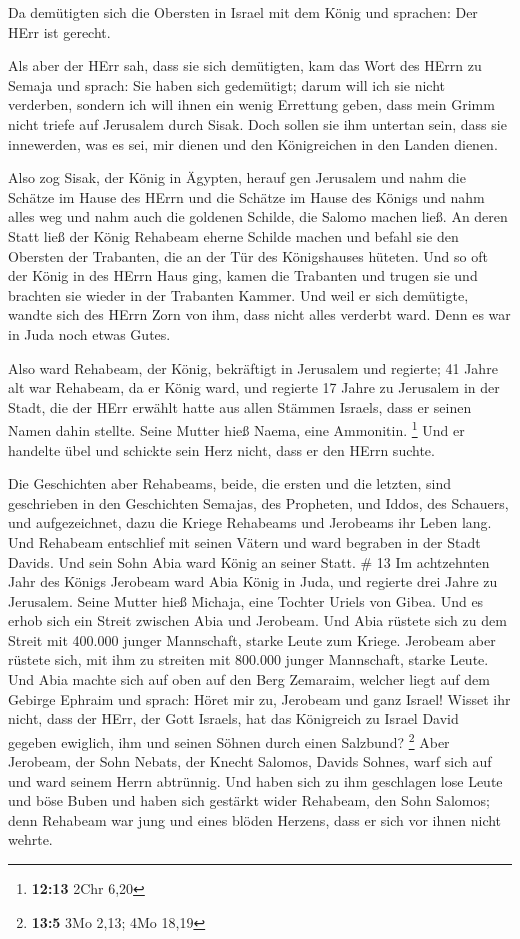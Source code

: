  Da demütigten sich die Obersten in Israel mit dem König und
sprachen: Der HErr ist gerecht.

 Als aber der HErr sah, dass sie sich demütigten, kam das
Wort des HErrn zu Semaja und sprach: Sie haben sich gedemütigt; darum
will ich sie nicht verderben, sondern ich will ihnen ein wenig Errettung
geben, dass mein Grimm nicht triefe auf Jerusalem durch Sisak.
 Doch sollen sie ihm untertan sein, dass sie innewerden, was
es sei, mir dienen und den Königreichen in den Landen dienen.

 Also zog Sisak, der König in Ägypten, herauf gen Jerusalem
und nahm die Schätze im Hause des HErrn und die Schätze im Hause des
Königs und nahm alles weg und nahm auch die goldenen Schilde, die Salomo
machen ließ.  An deren Statt ließ der König Rehabeam eherne
Schilde machen und befahl sie den Obersten der Trabanten, die an der Tür
des Königshauses hüteten.  Und so oft der König in des
HErrn Haus ging, kamen die Trabanten und trugen sie und brachten sie
wieder in der Trabanten Kammer.  Und weil er sich
demütigte, wandte sich des HErrn Zorn von ihm, dass nicht alles verderbt
ward. Denn es war in Juda noch etwas Gutes.

 Also ward Rehabeam, der König, bekräftigt in Jerusalem und
regierte; 41 Jahre alt war Rehabeam, da er König ward, und regierte 17
Jahre zu Jerusalem in der Stadt, die der HErr erwählt hatte aus allen
Stämmen Israels, dass er seinen Namen dahin stellte. Seine Mutter hieß
Naema, eine Ammonitin. \footnote{\textbf{12:13} 2Chr 6,20} 
Und er handelte übel und schickte sein Herz nicht, dass er den HErrn
suchte.

 Die Geschichten aber Rehabeams, beide, die ersten und die
letzten, sind geschrieben in den Geschichten Semajas, des Propheten, und
Iddos, des Schauers, und aufgezeichnet, dazu die Kriege Rehabeams und
Jerobeams ihr Leben lang.  Und Rehabeam entschlief mit
seinen Vätern und ward begraben in der Stadt Davids. Und sein Sohn Abia
ward König an seiner Statt. \# 13  Im achtzehnten Jahr des
Königs Jerobeam ward Abia König in Juda,  und regierte drei
Jahre zu Jerusalem. Seine Mutter hieß Michaja, eine Tochter Uriels von
Gibea. Und es erhob sich ein Streit zwischen Abia und Jerobeam.
 Und Abia rüstete sich zu dem Streit mit 400.000 junger
Mannschaft, starke Leute zum Kriege. Jerobeam aber rüstete sich, mit ihm
zu streiten mit 800.000 junger Mannschaft, starke Leute. 
Und Abia machte sich auf oben auf den Berg Zemaraim, welcher liegt auf
dem Gebirge Ephraim und sprach: Höret mir zu, Jerobeam und ganz Israel!
 Wisset ihr nicht, dass der HErr, der Gott Israels, hat das
Königreich zu Israel David gegeben ewiglich, ihm und seinen Söhnen durch
einen Salzbund? \footnote{\textbf{13:5} 3Mo 2,13; 4Mo 18,19}
 Aber Jerobeam, der Sohn Nebats, der Knecht Salomos, Davids
Sohnes, warf sich auf und ward seinem Herrn abtrünnig.  Und
haben sich zu ihm geschlagen lose Leute und böse Buben und haben sich
gestärkt wider Rehabeam, den Sohn Salomos; denn Rehabeam war jung und
eines blöden Herzens, dass er sich vor ihnen nicht wehrte.


